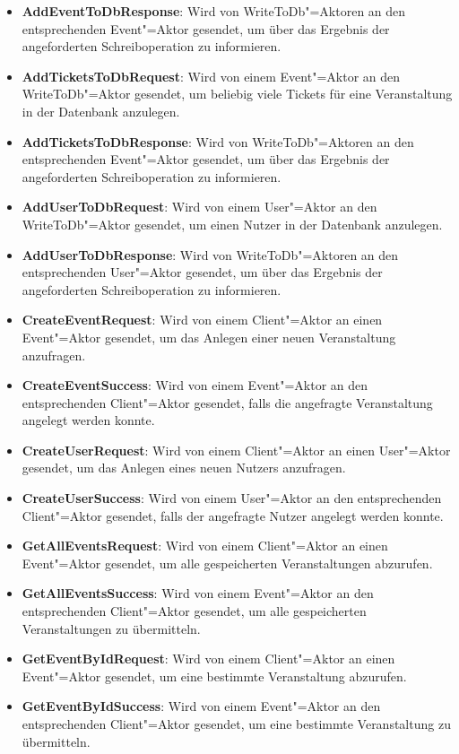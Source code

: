 \begin{itemize}[itemsep=-.5em,leftmargin=*]
    \item \textbf{AddEventToDbResponse}: Wird von WriteToDb"=Aktoren an den entsprechenden Event"=Aktor gesendet, um über das Ergebnis der angeforderten Schreiboperation zu informieren.
    \item \textbf{AddTicketsToDbRequest}: Wird von einem Event"=Aktor an den WriteToDb"=Aktor gesendet, um beliebig viele Tickets für eine Veranstaltung in der Datenbank anzulegen.
    \item \textbf{AddTicketsToDbResponse}: Wird von WriteToDb"=Aktoren an den entsprechenden Event"=Aktor gesendet, um über das Ergebnis der angeforderten Schreiboperation zu informieren.
    \item \textbf{AddUserToDbRequest}: Wird von einem User"=Aktor an den WriteToDb"=Aktor gesendet, um einen Nutzer in der Datenbank anzulegen.
    \item \textbf{AddUserToDbResponse}: Wird von WriteToDb"=Aktoren an den entsprechenden User"=Aktor gesendet, um über das Ergebnis der angeforderten Schreiboperation zu informieren.
    \item \textbf{CreateEventRequest}:  Wird von einem Client"=Aktor an einen Event"=Aktor gesendet, um das Anlegen einer neuen Veranstaltung anzufragen.
    \item \textbf{CreateEventSuccess}: Wird von einem Event"=Aktor an den entsprechenden Client"=Aktor gesendet, falls die angefragte Veranstaltung angelegt werden konnte.
    \item \textbf{CreateUserRequest}: Wird von einem Client"=Aktor an einen User"=Aktor gesendet, um das Anlegen eines neuen Nutzers anzufragen.
    \item \textbf{CreateUserSuccess}: Wird von einem User"=Aktor an den entsprechenden Client"=Aktor gesendet, falls der angefragte Nutzer angelegt werden konnte.
    \item \textbf{GetAllEventsRequest}: Wird von einem Client"=Aktor an einen Event"=Aktor gesendet, um alle gespeicherten Veranstaltungen abzurufen.
    \item \textbf{GetAllEventsSuccess}: Wird von einem Event"=Aktor an den entsprechenden Client"=Aktor gesendet, um alle gespeicherten Veranstaltungen zu übermitteln. 
    \item \textbf{GetEventByIdRequest}: Wird von einem Client"=Aktor an einen Event"=Aktor gesendet, um eine bestimmte Veranstaltung abzurufen.
    \item \textbf{GetEventByIdSuccess}: Wird von einem Event"=Aktor an den entsprechenden Client"=Aktor gesendet, um eine bestimmte Veranstaltung zu übermitteln.

\end{itemize}
